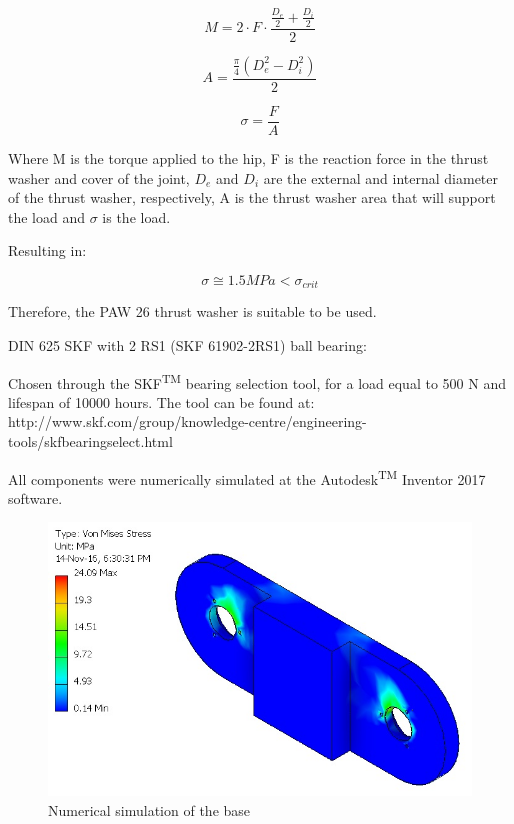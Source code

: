    \begin{equation}
   M = 2\cdot F\cdot\frac{\frac{D_e}{2}+\frac{D_i}{2}}{2}
   \end{equation}
   
   \begin{equation}
   A = \frac{\frac{\pi}{4}(D_e^2-D_i^2)}{2}
   \end{equation}
   
   \begin{equation}
   \sigma = \frac{F}{A}
   \end{equation}
   
   Where M is the torque applied to the hip, F is the reaction force in the thrust washer and cover of the joint, $D_e$ and $D_i$ are the external and internal diameter of the thrust washer, respectively, A is the thrust washer area that will support the load and $\sigma$ is the load.
   
   Resulting in:
   
   $$\sigma \cong 1.5 MPa < \sigma_{crit}$$
   
   Therefore, the PAW 26 thrust washer is suitable to be used.
   
   DIN 625 SKF with 2 RS1 (SKF 61902-2RS1) ball bearing:
   
   Chosen through the SKF\textsuperscript{TM} bearing selection tool, for a load equal to 500 N and lifespan of 10000 hours. The tool can be found at: http://www.skf.com/group/knowledge-centre/engineering-tools/skfbearingselect.html
   
   All components were numerically simulated at the Autodesk\textsuperscript{TM} Inventor 2017 software. 
   
   \begin{figure}[thpb]
      \centering
      \includegraphics[scale=0.6]{Images/Simulacao_Base.jpg}
      \caption{Numerical simulation of the base}
      \label{simulacao base}
   \end{figure}
   
